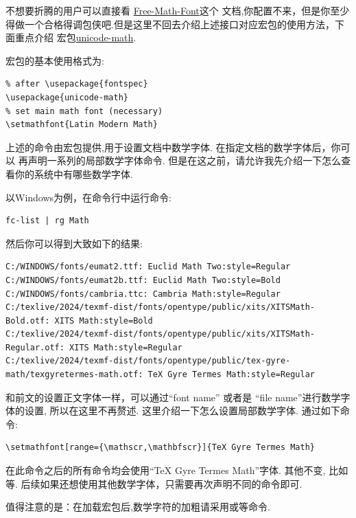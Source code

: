 不想要折腾的用户可以直接看 \href{http://mirrors.ctan.org/info/Free_Math_Font_Survey/en/survey.pdf}{Free-Math-Font}这个 
文档,你配置不来，但是你至少得做一个合格得调包侠吧.但是这里不回去介绍上述接口对应宏包的使用方法，下面重点介绍
宏包\href{http://mirrors.ctan.org/macros/unicodetex/latex/unicode-math/unicode-math.pdf}{unicode-math}. 

宏包的基本使用格式为:
\begin{verbatim}
% after \usepackage{fontspec}
\usepackage{unicode-math}
% set main math font (necessary)
\setmathfont{Latin Modern Math}
\end{verbatim}

上述的命令\cmd{\setmathfont}\index{\cmd{\setmathfont}}由宏包提供,用于设置文档中数学字体. 在指定文档的数学字体后，你可以
再声明一系列的局部数学字体命令. 但是在这之前，请允许我先介绍一下怎么查看你的系统中有哪些数学字体. 

以Windows为例，在命令行中运行命令:
\begin{verbatim}
fc-list | rg Math
\end{verbatim}

然后你可以得到大致如下的结果:
\begin{verbatim}
C:/WINDOWS/fonts/eumat2.ttf: Euclid Math Two:style=Regular
C:/WINDOWS/fonts/eumat2b.ttf: Euclid Math Two:style=Bold
C:/WINDOWS/fonts/cambria.ttc: Cambria Math:style=Regular
C:/texlive/2024/texmf-dist/fonts/opentype/public/xits/XITSMath-Bold.otf: XITS Math:style=Bold
C:/texlive/2024/texmf-dist/fonts/opentype/public/xits/XITSMath-Regular.otf: XITS Math:style=Regular
C:/texlive/2024/texmf-dist/fonts/opentype/public/tex-gyre-math/texgyretermes-math.otf: TeX Gyre Termes Math:style=Regular
\end{verbatim}

和前文的设置正文字体一样，可以通过``font name'' 或者是 ``file name''进行数学字体的设置, 所以在这里不再赘述. 
这里介绍一下怎么设置局部数学字体. 通过如下命令:
\begin{verbatim}
\setmathfont[range={\mathscr,\mathbfscr}]{TeX Gyre Termes Math}
\end{verbatim}

在此命令之后的所有\cmd{\mathscr, \mathbfscr}命令均会使用``TeX Gyre Termes Math''字体. 其他不变, 比如\cmd{\mathrm, \mathbf}等.
后续如果还想使用其他数学字体，只需要再次声明不同的\cmd{\setmathfont}命令即可.

\begin{leftbar}
值得注意的是：在加载宏包后,数学字符的加粗请采用\cmd{\boldsymbol}或\cmd{\symbf, \symbfit, \symbfup}等命令.
\end{leftbar}

